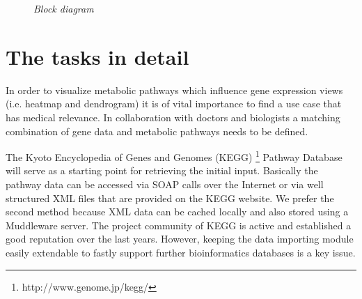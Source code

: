 \begin{figure}[ht]
\centering
{} 
\caption[Block diagram]{\textit{Block diagram}} 
\label{gfx:block_diagram}
\end{figure}

\chapter{The tasks in detail}


In order to visualize metabolic pathways which influence gene expression views (i.e. heatmap and dendrogram) it is of vital importance to find a use case that has medical relevance.
In collaboration with doctors and biologists a matching combination of gene data and metabolic pathways needs to be defined.


The Kyoto Encyclopedia of Genes and Genomes (KEGG) \footnote{http://www.genome.jp/kegg/} Pathway Database will serve as a starting point for retrieving the initial input. Basically the pathway data can be accessed via SOAP calls over the Internet or via well structured XML files that are provided on the KEGG website. We prefer the second method because XML data can be cached locally and also stored using a Muddleware server.
The project community of KEGG is active and established a good reputation over the last years. 
However, keeping the data importing module easily extendable to fastly support further bioinformatics databases is a key issue.


